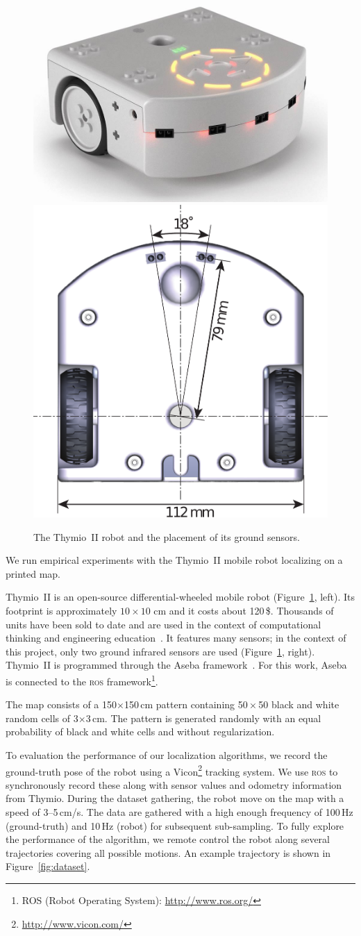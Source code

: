 \documentclass[letterpaper, 10pt, conference]{ieeeconf}
\newcommand{\fig}[1]{Figure~\ref{fig:#1}}
\begin{document}
\begin{figure}
\includegraphics[width=.56\columnwidth]{thymio2-shadow}\hfill
\includegraphics[width=.42\columnwidth]{thymio2-dimensions}
\caption{The Thymio~II robot and the placement of its ground sensors.}
\label{fig:thymio}
\end{figure}

We run empirical experiments with the Thymio~II mobile robot localizing on a printed map.

Thymio~II is an open-source differential-wheeled mobile robot (\fig{thymio}, left).
Its footprint is approximately $10 \times 10$ cm and it costs about 120\,\$.
Thousands of units have been sold to date and are used in the context of computational thinking and engineering education~\cite{riedo2015thymio}.
It features many sensors; in the context of this project, only two ground infrared sensors are used (\fig{thymio}, right).
Thymio~II is programmed through the Aseba framework~\cite{aseba2011tmech}.
For this work, Aseba is connected to the \textsc{ros} framework\footnote{ROS (Robot Operating System): \url{http://www.ros.org/}}.

The map consists of a 150$\times$150\,cm pattern containing 50\,$\times$\,50 black and white random cells of 3$\times$3\,cm.
The pattern is generated randomly with an equal probability of black and white cells and without regularization.

To evaluation the performance of our localization algorithms, we record the ground-truth pose of the robot using a Vicon\footnote{\url{http://www.vicon.com/}} tracking system.
We use \textsc{ros} to synchronously record these along with sensor values and odometry information from Thymio.
During the dataset gathering, the robot move on the map with a speed of 3--5\,cm/s.
The data are gathered with a high enough frequency of 100\,Hz (ground-truth) and 10\,Hz (robot) for subsequent sub-sampling.
To fully explore the performance of the algorithm, we remote control the robot along several trajectories covering all possible motions.
An example trajectory is shown in \fig{dataset}.
\end{document}
